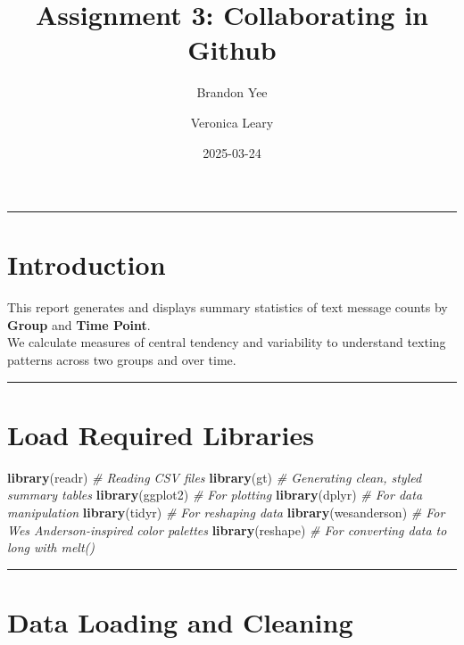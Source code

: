 \documentclass[
]{article}
\title{Assignment 3: Collaborating in Github}
\author{Brandon Yee \and Veronica Leary}
\date{2025-03-24}
\newenvironment{Shaded}{\begin{snugshade}}{\end{snugshade}}
\newcommand{\CommentTok}[1]{\textcolor[rgb]{0.56,0.35,0.01}{\textit{#1}}}
\newcommand{\FunctionTok}[1]{\textcolor[rgb]{0.13,0.29,0.53}{\textbf{#1}}}
\newcommand{\NormalTok}[1]{#1}
\begin{document}
\maketitle

\begin{center}\rule{0.5\linewidth}{0.5pt}\end{center}

\section{Introduction}\label{introduction}

This report generates and displays summary statistics of text message
counts by \textbf{Group} and \textbf{Time Point}.\\
We calculate measures of central tendency and variability to understand
texting patterns across two groups and over time.

\begin{center}\rule{0.5\linewidth}{0.5pt}\end{center}

\section{Load Required Libraries}\label{load-required-libraries}

\begin{Shaded}
\begin{Highlighting}[]
\FunctionTok{library}\NormalTok{(readr)          }\CommentTok{\# Reading CSV files}
\FunctionTok{library}\NormalTok{(gt)             }\CommentTok{\# Generating clean, styled summary tables}
\FunctionTok{library}\NormalTok{(ggplot2)        }\CommentTok{\# For plotting}
\FunctionTok{library}\NormalTok{(dplyr)          }\CommentTok{\# For data manipulation}
\FunctionTok{library}\NormalTok{(tidyr)          }\CommentTok{\# For reshaping data}
\FunctionTok{library}\NormalTok{(wesanderson)    }\CommentTok{\# For Wes Anderson{-}inspired color palettes}
\FunctionTok{library}\NormalTok{(reshape)        }\CommentTok{\# For converting data to long with melt()}
\end{Highlighting}
\end{Shaded}

\begin{center}\rule{0.5\linewidth}{0.5pt}\end{center}

\section{Data Loading and Cleaning}\label{data-loading-and-cleaning}
\end{document}
